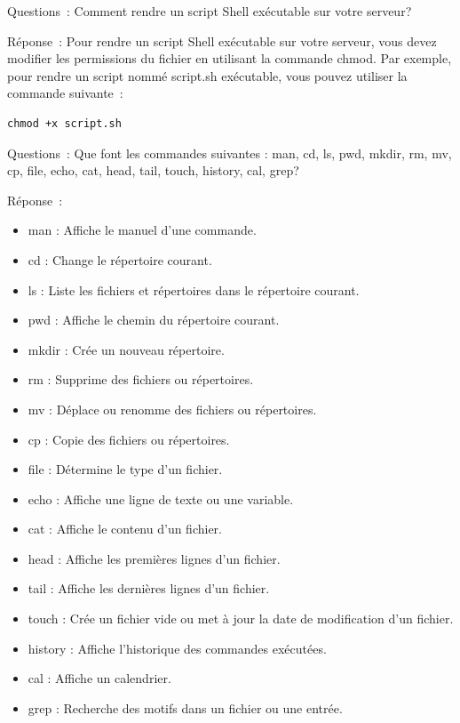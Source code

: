 \vspace{0.5cm}

Questions~: Comment rendre un script Shell exécutable sur votre serveur?

\noindent Réponse~: Pour rendre un script Shell exécutable sur votre serveur, vous devez modifier les permissions du fichier en utilisant la commande chmod. Par exemple, pour rendre un script nommé script.sh exécutable, vous pouvez utiliser la commande suivante~:
\begin{verbatim}
chmod +x script.sh
\end{verbatim}

\vspace{0.5cm}

Questions~: Que font les commandes suivantes : man, cd, ls, pwd, mkdir, rm, mv, cp, file, echo, cat, head, tail, touch, history, cal, grep?

\noindent Réponse~:
\begin{itemize}
	\item man : Affiche le manuel d'une commande.
	\item cd : Change le répertoire courant.
	\item ls : Liste les fichiers et répertoires dans le répertoire courant.
	\item pwd : Affiche le chemin du répertoire courant.
	\item mkdir : Crée un nouveau répertoire.
	\item rm : Supprime des fichiers ou répertoires.
	\item mv : Déplace ou renomme des fichiers ou répertoires.
	\item cp : Copie des fichiers ou répertoires.
	\item file : Détermine le type d'un fichier.
	\item echo : Affiche une ligne de texte ou une variable.
	\item cat : Affiche le contenu d'un fichier.
	\item head : Affiche les premières lignes d'un fichier.
	\item tail : Affiche les dernières lignes d'un fichier.
	\item touch : Crée un fichier vide ou met à jour la date de modification d'un fichier.
	\item history : Affiche l'historique des commandes exécutées.
	\item cal : Affiche un calendrier.
	\item grep : Recherche des motifs dans un fichier ou une entrée.
\end{itemize}

